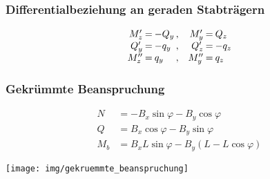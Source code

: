 \documentclass{article}
\begin{document}
\begin{multicols*}{4}
				\subsubsection{Differentialbeziehung an geraden Stabträgern} %
					\[
						\begin{array}{r@{\:=\:}l@{\, , \quad}r@{\:=\:}l}
							M_z' & -Q_y & M_y' & Q_z \\
							Q_y' & -q_y & Q_z' & -q_z \\
							M_z'' & q_y & M_y'' & q_z
						\end{array}
					\]
				\subsubsection{Gekrümmte Beanspruchung} %
					\begin{align*}
						N &= - B_x \sin \varphi - B_y \cos \varphi \\
						Q &= B_x \cos \varphi - B_y \sin \varphi \\
						M_b &= B_x L \sin \varphi - B_y (L - L \cos \varphi)
					\end{align*}
					\begin{center}
						\texttt{[image: img/gekruemmte\_beanspruchung]}
					\end{center}
	\end{multicols*}
\end{document}
